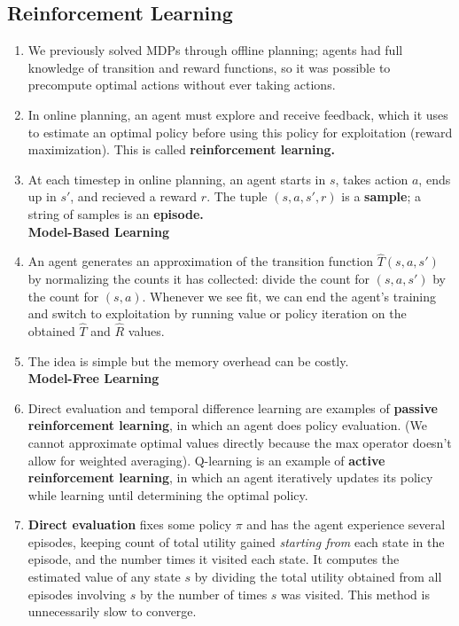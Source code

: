 \documentclass[10pt]{article}
\newcommand{\Est}[1]{\hat{#1}}
\begin{document}
\begin{multicols}{2}
\begin{enumerate}
    \subsection{Reinforcement Learning}
    \begin{enumerate}
        \item We previously solved MDPs through offline planning; agents had full knowledge of transition and reward functions, so it was possible to precompute optimal actions without ever taking actions.
        \item In online planning, an agent must explore and receive feedback, which it uses to estimate an optimal policy before using this policy for exploitation (reward maximization). This is called \textbf{reinforcement learning.}
        \item At each timestep in online planning, an agent starts in $s$, takes action $a$, ends up in $s'$, and recieved a reward $r$. The tuple $(s,a,s',r)$ is a \textbf{sample}; a string of samples is an \textbf{episode.} \\[8 pt]
        \textbf{Model-Based Learning} 
        \item An agent generates an approximation of the transition function $\Est{T}(s,a,s')$ by normalizing the counts it has collected: divide the count for $(s,a,s')$ by the count for $(s,a)$. Whenever we see fit, we can end the agent's training and switch to exploitation by running value or policy iteration on the obtained $\Est{T}$ and $\Est{R}$ values. 
        \item The idea is simple but the memory overhead can be costly. \\[8 pt]
        \textbf{Model-Free Learning}
        \item Direct evaluation and temporal difference learning are examples of \textbf{passive reinforcement learning}, in which an agent does policy evaluation. (We cannot approximate optimal values directly because the max operator doesn't allow for weighted averaging). Q-learning is an example of \textbf{active reinforcement learning}, in which an agent iteratively updates its policy while learning until determining the optimal policy.
        \item \textbf{Direct evaluation} fixes some policy $\pi$ and has the agent experience several episodes, keeping count of total utility gained \textit{starting from} each state in the episode, and the number times it visited each state. It computes the estimated value of any state $s$ by dividing the total utility obtained from all episodes involving $s$ by the number of times $s$ was visited. This method is unnecessarily slow to converge.

\end{enumerate}
\end{enumerate}
\end{multicols}
\end{document}
